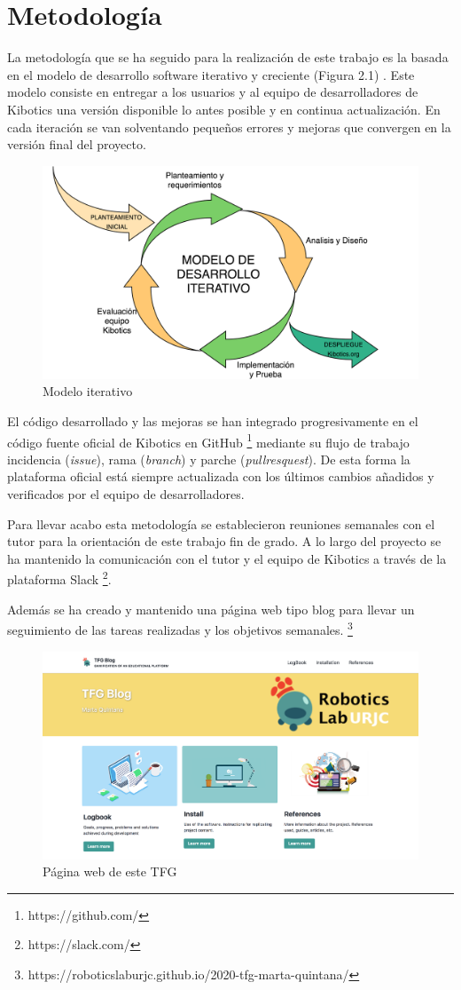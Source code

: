  
\section{Metodología}

La metodología que se ha seguido para la realización de este trabajo es la basada en el modelo de desarrollo software iterativo y creciente (Figura 2.1) \cite{modeloiter}.
Este modelo consiste en entregar a los usuarios y al equipo de desarrolladores de Kibotics una versión disponible lo antes posible y en continua actualización. En cada iteración se van solventando pequeños errores y mejoras que convergen en la versión final del proyecto.

\begin{figure}[H]
    \centering
    \includegraphics[width=0.6\columnwidth]{chapters/images/metodologiaiterativa.png}
    \caption{Modelo iterativo}
    \label{fig:my_label}
\end{figure}


El código desarrollado y las mejoras se han integrado progresivamente en el código fuente oficial de Kibotics en GitHub \footnote{https://github.com/} mediante su flujo de trabajo  incidencia (\textit{issue}), rama (\textit{branch}) y parche (\textit{pullresquest}). De esta forma la plataforma oficial está siempre actualizada con los últimos cambios añadidos y verificados por el equipo de desarrolladores.

Para llevar acabo esta metodología se establecieron reuniones semanales con el tutor para la orientación de este trabajo fin de grado. A lo largo del proyecto se ha mantenido la comunicación con el tutor y el equipo de Kibotics a través de la plataforma Slack \footnote{https://slack.com/}. 



Además se ha creado y mantenido  una página web tipo blog para llevar un seguimiento de las tareas realizadas y los objetivos semanales. \footnote{https://roboticslaburjc.github.io/2020-tfg-marta-quintana/}

\begin{figure}[H]
    \centering
    \includegraphics[width=0.6\linewidth]{chapters/images/webtfg.png}
    \caption{Página web de este TFG}
    \label{fig:my_label}
\end{figure}

